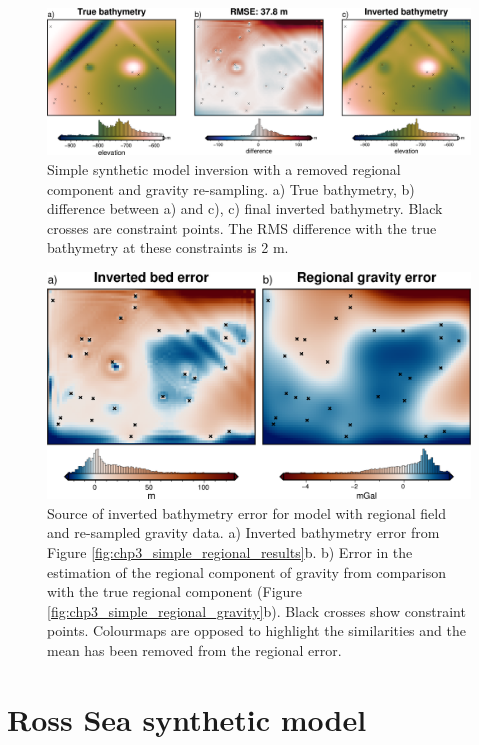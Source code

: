 \begin{figure}[!ht]
    \centering
    \includegraphics[width=.95\textwidth]{figures/chp3/chp3_simple_regional_sampled_results.png}
    \caption[Synthetic inversion with regional and re-sampling, results]{Simple synthetic model inversion with a removed regional component and gravity re-sampling. a) True bathymetry, b) difference between a) and c), c) final inverted bathymetry. Black crosses are constraint points. The RMS difference with the true bathymetry at these constraints is 2 m.}
    \label{fig:appB_simple_regional_sampled_results}
\end{figure}

\begin{figure}[!ht]
    \centering
    \includegraphics[width=.7\textwidth]{figures/chp3/chp3_simple_regional_sampled_bed_error.png}
    \caption[Inversion and regional error for model with regional and low-res gravity]{Source of inverted bathymetry error for model with regional field and re-sampled gravity data. a) Inverted bathymetry error from Figure \ref{fig:chp3_simple_regional_results}b. b) Error in the estimation of the regional component of gravity from comparison with the true regional component (Figure \ref{fig:chp3_simple_regional_gravity}b). Black crosses show constraint points. Colourmaps are opposed to highlight the similarities and the mean has been removed from the regional error.}
    \label{fig:appB_simple_regional_sampled_bed_error}
\end{figure}


\section{Ross Sea synthetic model}\label{appB_Ross_Sea}

